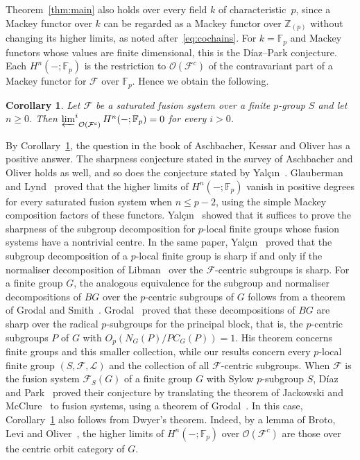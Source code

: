 \documentclass[10pt]{amsart}
\newtheorem{corollary}[theorem]{Corollary}
\theoremstyle{definition}
\numberwithin{equation}{section}
\renewcommand{\le}{\leqslant}
\renewcommand{\ge}{\geqslant}
\newcommand{\F}{\mathcal F}
\newcommand{\Op}{\mathcal O}
\newcommand{\limi}[2]{\mathop{\varprojlim\nolimits^{#1}}_{#2}}
\begin{document}
Theorem~\ref{thm:main} also holds over every field $k$ of characteristic~$p$, since a Mackey functor over $k$ can be regarded as a Mackey functor over $\mathbb{Z}_{(p)}$ without changing its higher limits, as noted after~\eqref{eq:cochains}. For $k=\mathbb{F}_p$ and Mackey functors whose values are finite dimensional, this is the D\'iaz--Park conjecture. Each $H^n(-;\mathbb{F}_p)$ is the restriction to $\Op(\F^c)$ of the contravariant part of a Mackey functor for $\F$ over $\mathbb{F}_p$. Hence we obtain the following.

\begin{corollary}\label{cor:cohomology}
Let $\F$ be a saturated fusion system over a finite $p$-group $S$ and let $n\ge0$. Then $\limi{i}{\Op(\F^c)}H^n(-;\mathbb{F}_p)=0$ for every $i>0$.
\end{corollary}

By Corollary~\ref{cor:cohomology}, the question in the book of Aschbacher, Kessar and Oliver has a positive answer. The sharpness conjecture stated in the survey of Aschbacher and Oliver holds as well, and so does the conjecture stated by Yal\c{c}\i{}n~\cite[Conjecture~1.2]{Yalcin}. Glauberman and Lynd~\cite{GL} proved that the higher limits of $H^n(-;\mathbb{F}_p)$ vanish in positive degrees for every saturated fusion system when $n\le p-2$, using the simple Mackey composition factors of these functors. Yal\c{c}\i{}n~\cite[Theorem~1.8]{Yalcin} showed that it suffices to prove the sharpness of the subgroup decomposition for $p$-local finite groups whose fusion systems have a nontrivial centre. In the same paper, Yal\c{c}\i{}n~\cite[Theorem~1.9]{Yalcin} proved that the subgroup decomposition of a $p$-local finite group is sharp if and only if the normaliser decomposition of Libman~\cite{Libman2006} over the $\F$-centric subgroups is sharp. For a finite group $G$, the analogous equivalence for the subgroup and normaliser decompositions of $BG$ over the $p$-centric subgroups of $G$ follows from a theorem of Grodal and Smith~\cite[Theorem~1.1 and Remark~3.2]{GrodalSmith}. Grodal~\cite[Theorem~1.5]{Grodal} proved that these decompositions of $BG$ are sharp over the radical $p$-subgroups for the principal block, that is, the $p$-centric subgroups $P$ of $G$ with $O_p(N_G(P)/PC_G(P))=1$. His theorem concerns finite groups and this smaller collection, while our results concern every $p$-local finite group $(S,\F,\mathcal L)$ and the collection of all $\F$-centric subgroups. When $\F$ is the fusion system $\F_S(G)$ of a finite group $G$ with Sylow $p$-subgroup $S$, D\'iaz and Park~\cite[Theorem~B]{DP} proved their conjecture by translating the theorem of Jackowski and McClure~\cite[Corollary~5.16]{JM1992} to fusion systems, using a theorem of Grodal~\cite[Theorem~1.2]{Grodal}. In this case, Corollary~\ref{cor:cohomology} also follows from Dwyer's theorem. Indeed, by a lemma of Broto, Levi and Oliver~\cite[Lemma~1.3]{BLOInvent}, the higher limits of $H^n(-;\mathbb{F}_p)$ over $\Op(\F^c)$ are those over the centric orbit category of $G$.
\end{document}

